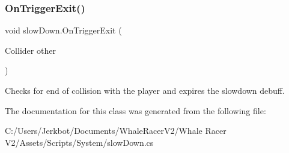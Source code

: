 \mbox{\label{classslow_down_a2761b8e6f224459dcbe3b5835b012442}} 
\subsubsection{\texorpdfstring{On\+Trigger\+Exit()}{OnTriggerExit()}}
{\footnotesize\ttfamily void slow\+Down.\+On\+Trigger\+Exit (\begin{DoxyParamCaption}\item[{Collider}]{other }\end{DoxyParamCaption})\hspace{0.3cm}{\ttfamily [private]}}



Checks for end of collision with the player and expires the slowdown debuff. 



The documentation for this class was generated from the following file\+:\begin{DoxyCompactItemize}
\item 
C\+:/\+Users/\+Jerkbot/\+Documents/\+Whale\+Racer\+V2/\+Whale Racer V2/\+Assets/\+Scripts/\+System/slow\+Down.\+cs\end{DoxyCompactItemize}
